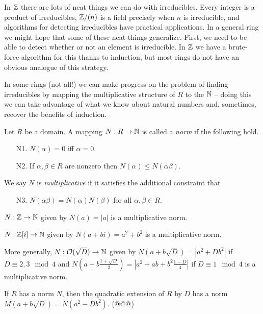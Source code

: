 In \(\mathbb{Z}\) there are lots of neat things we can do with irreducibles. Every integer is a product of irreducibles, \(\mathbb{Z}/(n)\) is a field precisely when \(n\) is irreducible, and algorithms for detecting irreducibles have practical applications. In a general ring we might hope that some of these neat things generalize. First, we need to be able to detect whether or not an element is irreducible. In \(\mathbb{Z}\) we have a brute-force algorithm for this thanks to induction, but most rings do not have an obvious analogue of this strategy.

In some rings (not all!) we can make progress on the problem of finding irreducibles by mapping the multiplicative structure of \(R\) to the \(\mathbb{N}\) -- doing this we can take advantage of what we know about natural numbers and, sometimes, recover the benefits of induction.

\begin{dfn}[Norm] \label{dfn:norm}
Let \(R\) be a domain. A mapping \(N : R \rightarrow \mathbb{N}\) is called a \emph{norm}  if the following hold.
\begin{itemize}
\item[N1.] \(N(\alpha) = 0\) iff \(\alpha = 0\).
\item[N2.] If \(\alpha,\beta \in R\) are nonzero then \(N(\alpha) \leq N(\alpha\beta)\).
\end{itemize}
We say \(N\) is \emph{multiplicative} if it satisfies the additional constraint that
\begin{itemize}
\item[N3.] \(N(\alpha\beta) = N(\alpha)N(\beta)\) for all \(\alpha, \beta \in R\).
\end{itemize}
\end{dfn}

\begin{examples}
\item \(N : \mathbb{Z} \rightarrow \mathbb{N}\) given by \(N(a) = |a|\) is a multiplicative norm.
\item \(N : \mathbb{Z}[i] \rightarrow \mathbb{N}\) given by \(N(a+bi) = a^2 + b^2\) is a multiplicative norm.
\item More generally, \(N : \mathcal{O}(\sqrt{D}) \rightarrow \mathbb{N}\) given by \(N(a+b\sqrt{D}) = |a^2 + Db^2|\) if \(D \equiv 2,3 \mod 4\) and \(N(a+b\frac{1+\sqrt{D}}{2}) = |a^2 + ab + b^2\frac{1-D}{4}|\) if \(D \equiv 1 \mod 4\) is a multiplicative norm.
\item If \(R\) has a norm \(N\), then the quadratic extension of \(R\) by \(D\) has a norm \(M(a + b\sqrt{D}) = N(a^2 - Db^2)\). (@@@)
\end{examples}

